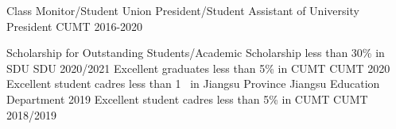 


\begin{cvhonors}

  \cvhonor
    {} %
    {Class Monitor/Student Union President/Student Assistant of University President} %
    {CUMT} %
    {2016-2020} %
\end{cvhonors}



\begin{cvhonors}
  \cvhonor
    {Scholarship for Outstanding Students/Academic Scholarship} %
    {less than 30\% in SDU} %
    {SDU} %
    {2020/2021} %
  \cvhonor
    {Excellent graduates} %
    {less than 5\% in CUMT} %
    {CUMT} %
    {2020} %
  \cvhonor
    {Excellent student cadres} %
    {less than 1\textperthousand ~ in Jiangsu Province} %
    {Jiangsu Education Department} %
    {2019} %
  \cvhonor
    {Excellent student cadres} %
    {less than 5\% in CUMT} %
    {CUMT} %
    {2018/2019} %
\end{cvhonors}
